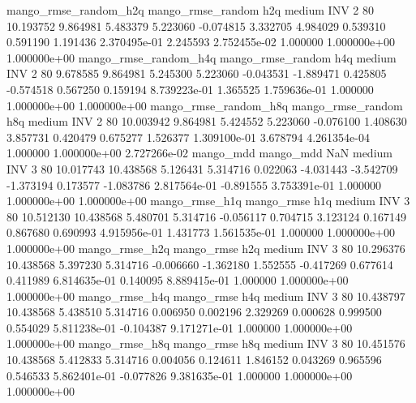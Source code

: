 mango_rmse_random_h2q mango_rmse_random                  h2q     medium      INV                 2 80 10.193752       9.864981 5.483379       5.223060   -0.074815      3.332705      4.984029     0.539310       0.591190  1.191436 2.370495e-01     2.245593   2.752455e-02            1.000000    1.000000e+00        1.000000e+00
mango_rmse_random_h4q mango_rmse_random                  h4q     medium      INV                 2 80  9.678585       9.864981 5.245300       5.223060   -0.043531     -1.889471      0.425805    -0.574518       0.567250  0.159194 8.739223e-01     1.365525   1.759636e-01            1.000000    1.000000e+00        1.000000e+00
mango_rmse_random_h8q mango_rmse_random                  h8q     medium      INV                 2 80 10.003942       9.864981 5.424552       5.223060   -0.076100      1.408630      3.857731     0.420479       0.675277  1.526377 1.309100e-01     3.678794   4.261354e-04            1.000000    1.000000e+00        2.727266e-02
            mango_mdd         mango_mdd                  NaN     medium      INV                 3 80 10.017743      10.438568 5.126431       5.314716    0.022063     -4.031443     -3.542709    -1.373194       0.173577 -1.083786 2.817564e-01    -0.891555   3.753391e-01            1.000000    1.000000e+00        1.000000e+00
       mango_rmse_h1q        mango_rmse                  h1q     medium      INV                 3 80 10.512130      10.438568 5.480701       5.314716   -0.056117      0.704715      3.123124     0.167149       0.867680  0.690993 4.915956e-01     1.431773   1.561535e-01            1.000000    1.000000e+00        1.000000e+00
       mango_rmse_h2q        mango_rmse                  h2q     medium      INV                 3 80 10.296376      10.438568 5.397230       5.314716   -0.006660     -1.362180      1.552555    -0.417269       0.677614  0.411989 6.814635e-01     0.140095   8.889415e-01            1.000000    1.000000e+00        1.000000e+00
       mango_rmse_h4q        mango_rmse                  h4q     medium      INV                 3 80 10.438797      10.438568 5.438510       5.314716    0.006950      0.002196      2.329269     0.000628       0.999500  0.554029 5.811238e-01    -0.104387   9.171271e-01            1.000000    1.000000e+00        1.000000e+00
       mango_rmse_h8q        mango_rmse                  h8q     medium      INV                 3 80 10.451576      10.438568 5.412833       5.314716    0.004056      0.124611      1.846152     0.043269       0.965596  0.546533 5.862401e-01    -0.077826   9.381635e-01            1.000000    1.000000e+00        1.000000e+00
